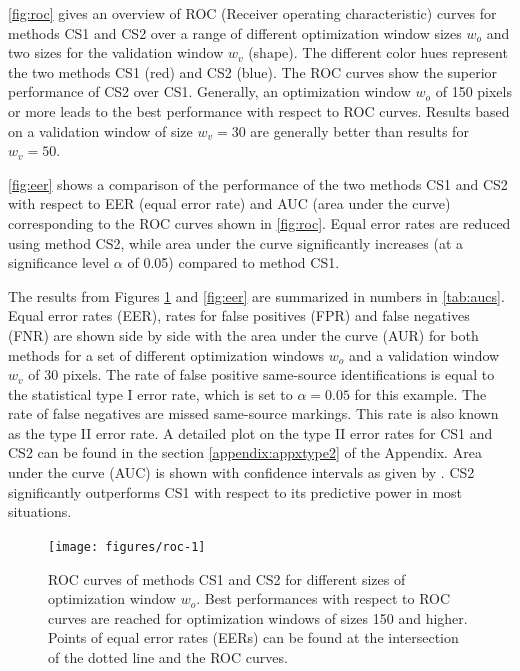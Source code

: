 \documentclass[12pt]{article}
\begin{document}
\autoref{fig:roc} gives an overview of ROC (Receiver operating
characteristic) curves for methods CS1 and CS2 over a range of different
optimization window sizes \(w_o\) and two sizes for the validation
window \(w_v\) (shape). The different color hues represent the two
methods CS1 (red) and CS2 (blue). The ROC curves show the superior
performance of CS2 over CS1. Generally, an optimization window \(w_o\)
of 150 pixels or more leads to the best performance with respect to ROC
curves. Results based on a validation window of size \(w_v = 30\) are
generally better than results for \(w_v = 50\).

\autoref{fig:eer} shows a comparison of the performance of the two
methods CS1 and CS2 with respect to EER (equal error rate) and AUC (area
under the curve) corresponding to the ROC curves shown in
\autoref{fig:roc}. Equal error rates are reduced using method CS2, while
area under the curve significantly increases (at a significance level
\(\alpha\) of 0.05) compared to method CS1.

The results from Figures \ref{fig:roc} and \ref{fig:eer} are summarized
in numbers in \autoref{tab:aucs}. Equal error rates (EER), rates for
false positives (FPR) and false negatives (FNR) are shown side by side
with the area under the curve (AUR) for both methods for a set of
different optimization windows \(w_o\) and a validation window \(w_v\)
of 30 pixels. The rate of false positive same-source identifications is
equal to the statistical type I error rate, which is set to
\(\alpha = 0.05\) for this example. The rate of false negatives are
missed same-source markings. This rate is also known as the type II
error rate. A detailed plot on the type II error rates for CS1 and CS2
can be found in the section \ref{appendix:appxtype2} of the Appendix.
Area under the curve (AUC) is shown with confidence intervals as given
by \citet{delong}. CS2 significantly outperforms CS1 with respect to its
predictive power in most situations.

\begin{figure}

{\centering \texttt{[image: figures/roc-1]} 

}

\caption{ROC curves of methods CS1 and CS2 for different sizes of optimization window $w_o$. Best performances with respect to  ROC curves are reached for optimization windows of sizes 150 and higher. Points of equal error rates (EERs) can be found at the intersection of the dotted line and the ROC curves.}\label{fig:roc}
\end{figure}
\end{document}
